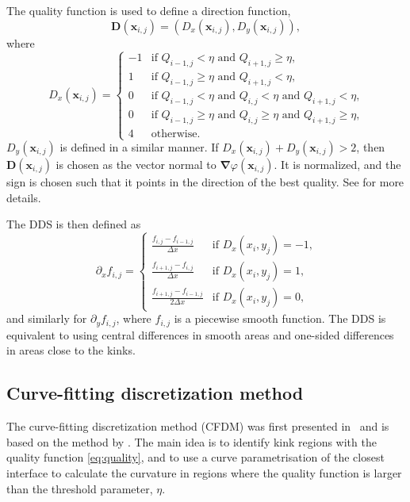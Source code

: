 \documentclass[11pt,b5paper,DIV=calc,BCOR1.3cm,headings=small,%
               footinclude=false,headsepline]{scrbook}
\newcommand*{\vct}[1]{\ensuremath{\boldsymbol{#1}}}
\newcommand*{\del}{\boldsymbol\nabla}
\newcommand*{\grad}{\del}
\begin{document}
The quality function is used to define a direction function,
\begin{equation}
  \vct D(\vct x_{i,j}) = (D_x(\vct x_{i,j}), D_y(\vct x_{i,j})),
\end{equation}
where
\begin{equation}
  D_x(\vct x_{i,j}) = \begin{cases}
    -1 & \text{if $Q_{i-1,j}<\eta$ and $Q_{i+1,j}\geq\eta$,} \\
     1 & \text{if $Q_{i-1,j}\geq\eta$ and $Q_{i+1,j}<\eta$,} \\
     0 & \text{if $Q_{i-1,j}<\eta$ and $Q_{i,j}<\eta$ and $Q_{i+1,j}<\eta$,} \\
     0 & \text{if $Q_{i-1,j}\geq\eta$ and $Q_{i,j}\geq\eta$ and
         $Q_{i+1,j}\geq\eta$,} \\
     4 & \text{otherwise.}
  \end{cases}
  \label{eq:dirfunc}
\end{equation}
$D_y(\vct x_{i,j})$ is defined in a similar manner.  If $D_x(\vct x_{i,j})
+ D_y(\vct x_{i,j}) > 2$, then $\vct D(\vct x_{i,j})$ is chosen as the vector
normal to $\grad\varphi(\vct x_{i,j})$.  It is normalized, and the sign is
chosen such that it points in the direction of the best quality.  See
\cite{Macklin05} for more details.

The DDS is then defined as
\begin{equation}
  \partial_x f_{i,j} = \begin{cases}
    \frac{f_{i,j} - f_{i-1,j}}{\Delta x}    & \text{if $D_x(x_i,y_j) = -1$,} \\
    \frac{f_{i+1,j} - f_{i,j}}{\Delta x}    & \text{if $D_x(x_i,y_j) =  1$,} \\
    \frac{f_{i+1,j} - f_{i-1,j}}{2\Delta x} & \text{if $D_x(x_i,y_j) =  0$,}
  \end{cases}
  \label{eq:Ddifference}
\end{equation}
and similarly for $\partial_y f_{i,j}$, where $f_{i,j}$ is a piecewise smooth
function.  The DDS is equivalent to using central differences in smooth areas
and one-sided differences in areas close to the kinks.

\subsection{Curve-fitting discretization method}
\label{sec:curvature-curve-fitting}
The curve-fitting discretization method (CFDM) was first presented
in~\cite{Lervag11} and is based on the method by \citet{Macklin06}.  The main
idea is to identify kink regions with the quality function \eqref{eq:quality},
and to use a curve parametrisation of the closest interface to calculate the
curvature in regions where the quality function is larger than the threshold
parameter, $\eta$.
\end{document}
